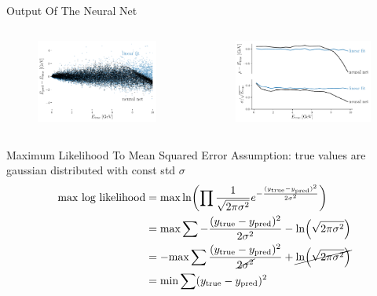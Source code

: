 \documentclass[10pt]{beamer}
\begin{document}
\begin{frame}{Output Of The Neural Net}
  \begin{columns}
    \begin{figure}[htp]
      \includegraphics[width=1.1\textwidth]{../images/data_augment.pdf}
    \end{figure}
    \begin{figure}[htp]
      \includegraphics[width=1.1\textwidth]{../images/data_augment_res.pdf}
    \end{figure}
  \end{columns}
\end{frame}

\begin{frame}{Maximum Likelihood To Mean Squared Error}
  Assumption: true values are gaussian distributed with const std $\sigma$
  \begin{align*}
    \text{max log likelihood} &= \text{max} \ln( \prod \frac{1}{\sqrt{2\pi \sigma^2}} e^{-\frac{(y_{\text{true}}-y_{\text{pred}})^2}{2 \sigma^2}}) \\
                              & =\text{max} \sum -\frac{(y_{\text{true}}-y_{\text{pred}})^2}{2 \sigma^2} - \ln(\sqrt{2\pi \sigma^2}) \\
                              & =-\text{max} \sum\frac{(y_{\text{true}}-y_{\text{pred}})^2}{\cancel{2 \sigma^2}} + \cancel{\ln(\sqrt{2\pi \sigma^2})} \\
                              & = \text{min} \sum (y_{\text{true}}-y_{\text{pred}})^2
  \end{align*}
\end{frame}
\end{document}
